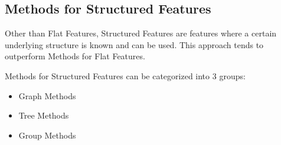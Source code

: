 \subsection{Methods for Structured Features}
\label{sec:methods.structured}


Other than Flat Features, Structured Features are features where a certain
underlying structure is known and can be used. This approach tends to outperform
Methods for Flat Features.

Methods for Structured Features can be categorized into $3$ groups:

\begin{itemize}
  \item Graph Methods
  \item Tree Methods
  \item Group Methods
\end{itemize}




